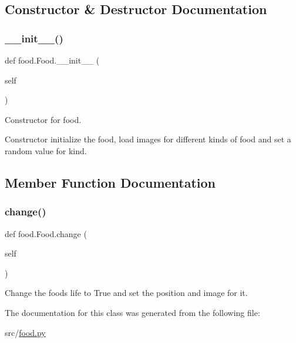 \subsection{Constructor \& Destructor Documentation}
\mbox{\label{classfood_1_1_food_ae050e5b3430466398fcf1673aeb7a786}} 
\subsubsection{\texorpdfstring{\_\_init\_\_()}{\_\_init\_\_()}}
{\footnotesize\ttfamily def food.\+Food.\+\_\+\+\_\+init\+\_\+\+\_\+ (\begin{DoxyParamCaption}\item[{}]{self }\end{DoxyParamCaption})}



Constructor for food. 

Constructor initialize the food, load images for different kinds of food and set a random value for kind. 

\subsection{Member Function Documentation}
\mbox{\label{classfood_1_1_food_a01fb6317a45a2b55d164eed27df6c555}} 
\subsubsection{\texorpdfstring{change()}{change()}}
{\footnotesize\ttfamily def food.\+Food.\+change (\begin{DoxyParamCaption}\item[{}]{self }\end{DoxyParamCaption})}



Change the food\textquotesingle{}s life to True and set the position and image for it. 



The documentation for this class was generated from the following file\+:\begin{DoxyCompactItemize}
\item 
src/\mbox{\hyperlink{food_8py}{food.\+py}}\end{DoxyCompactItemize}
